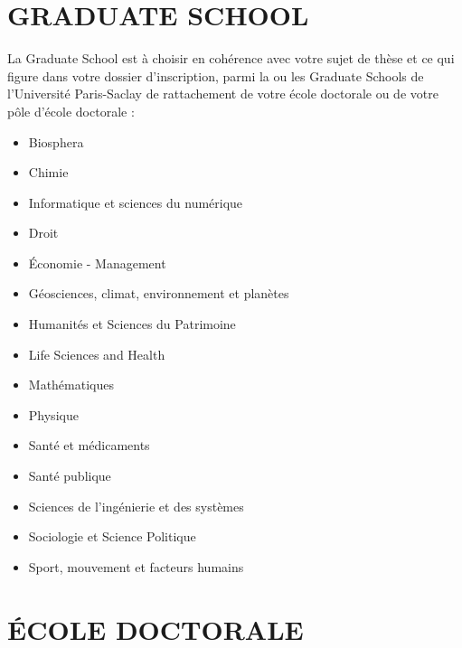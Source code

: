 \documentclass[main=french,a4paper]{book}
\begin{document}
\section{GRADUATE SCHOOL}
La Graduate School est à choisir en cohérence avec votre sujet de thèse et ce qui figure dans votre dossier d’inscription, parmi la ou les Graduate Schools de l’Université Paris-Saclay de rattachement de votre école doctorale ou de votre pôle d’école doctorale :

\begin{itemize}
\renewcommand{\labelitemi}{$\bullet$}
\item Biosphera
\item Chimie
\item Informatique et sciences du numérique
\item Droit
\item Économie - Management
\item Géosciences, climat, environnement et planètes
\item Humanités et Sciences du Patrimoine
\item Life Sciences and Health
\item Mathématiques
\item Physique
\item Santé et médicaments
\item Santé publique
\item Sciences de l’ingénierie et des systèmes
\item Sociologie et Science Politique
\item Sport, mouvement et facteurs humains
\end{itemize}

\section{ÉCOLE DOCTORALE}
\end{document}
